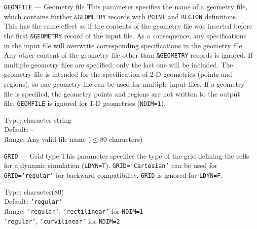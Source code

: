 \begin{keydescription}{\texttt{GEOMFILE} --- Geometry file}
%
  This parameter specifies the name of a geometry file, which contains further 
  \texttt{\&GEOMETRY} records with \texttt{POINT} and \texttt{REGION}
  definitions. This has the same effect as if the contents of the geometry file
  was inserted before the first \texttt{\&GEOMETRY} record of the input file.
  As a consequence, any specifications in the input file will overwrite
  corresponding specifications in the geometry file. Any other content of the
  geometry file other than \texttt{\&GEOMETRY} records is ignored. If multiple
  geometry files are specified, only the last one will be included. The geometry
  file is intended for the specification of 2-D geometries (points and regions),
  so one geometry file can be used for multiple input files. If a geometry file
  is specified, the geometry points and regions are not written to the output
  file.
  \texttt{GEOMFILE} is ignored for 1-D geometries (\texttt{NDIM=1}).
  \begin{keytab}
    Type:    \> character string \\
    Default: \> -- \\
    Range:   \> Any valid file name ($\le 80$ characters)
  \end{keytab}
\end{keydescription}

\begin{keydescription}{\texttt{GRID} --- Grid type}
%
  This parameter specifies the type of the grid defining the cells for a
  dynamic simulation (\texttt{LDYN=T}). \texttt{GRID='Cartesian'} can be used
  for \texttt{GRID='regular'} for backward compatibility. \texttt{GRID} is
  ignored for \texttt{LDYN=F}.
  \begin{keytab}
    Type:    \> character(80) \\
    Default: \> \texttt{'regular'} \\
    Range:   \> \texttt{'regular'}, \texttt{'rectilinear'} for \texttt{NDIM=1} \\ 
             \> \texttt{'regular'}, \texttt{'curvilinear'} for \texttt{NDIM=2}
  \end{keytab}
\end{keydescription}

